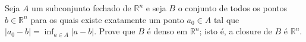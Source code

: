 Seja \(A\) um subconjunto fechado de \(\mathbb{R}^{n}\) e seja \(B\) o conjunto de todos os pontos \(b \in \mathbb{R}^{n}\) para os quais existe exatamente um ponto \(a_{0} \in A\) tal que \(|a_{0}-b|= \inf_{a\in A}|a-b|\). Prove que \(B\) é denso em \(\mathbb{R}^{n}\); isto é, a closure de \(B\) é \(\mathbb{R}^{n}\).
